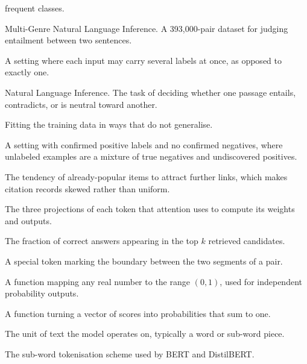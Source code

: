 \documentclass[11pt]{article}
\begin{document}
\begin{description}[style=nextline,leftmargin=1.2cm]
frequent classes.
\item[MNLI] Multi-Genre Natural Language Inference. A 393,000-pair dataset for
judging entailment between two sentences.
\item[Multi-label] A setting where each input may carry several labels at once,
as opposed to exactly one.
\item[NLI] Natural Language Inference. The task of deciding whether one passage
entails, contradicts, or is neutral toward another.
\item[Overfitting] Fitting the training data in ways that do not generalise.
\item[Positive-unlabeled learning] A setting with confirmed positive labels and
no confirmed negatives, where unlabeled examples are a mixture of true negatives
and undiscovered positives.
\item[Preferential attachment] The tendency of already-popular items to attract
further links, which makes citation records skewed rather than uniform.
\item[Query, key, value] The three projections of each token that attention uses
to compute its weights and outputs.
\item[Recall@k] The fraction of correct answers appearing in the top $k$
retrieved candidates.
\item[{[SEP]}] A special token marking the boundary between the two segments of a
pair.
\item[Sigmoid] A function mapping any real number to the range $(0,1)$, used for
independent probability outputs.
\item[Softmax] A function turning a vector of scores into probabilities that sum
to one.
\item[Token] The unit of text the model operates on, typically a word or
sub-word piece.
\item[WordPiece] The sub-word tokenisation scheme used by BERT and DistilBERT.
\end{description}
\end{document}

